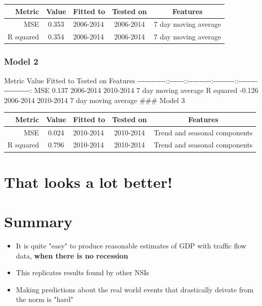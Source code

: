 \documentclass[11pt]{article}
\providecommand{\tightlist}{%
      \setlength{\itemsep}{0pt}\setlength{\parskip}{0pt}}
\begin{document}
\begin{longtable}[c]{@{}rclcc@{}}
\toprule
Metric & Value & Fitted to & Tested on & Features\tabularnewline
\midrule
\endhead
MSE & 0.353 & 2006-2014 & 2006-2014 & 7 day moving
average\tabularnewline
R squared & 0.354 & 2006-2014 & 2006-2014 & 7 day moving
average\tabularnewline
\bottomrule
\end{longtable}

\subsubsection{Model 2}\label{model-2}

\textbar{} Metric \textbar{} Value \textbar{} Fitted to \textbar{}
Tested on \textbar{}Features \textbar{} \textbar{}
-\/-\/-\/-\/-\/-\/-\/-\/-\/-\/-\/-:\textbar{}:-\/-\/-\/-\/-\/-:\textbar{}:-\/-\/-\/-\/-\/-\/-\/-\/-\/-\textbar{}:-\/-\/-\/-\/-\/-\/-\/-\/-:\textbar{}:-\/-\/-\/-\/-\/-\/-\/-\/-\/-\/-\/-\/-\/-\/-\/-\/-\/-\/-:\textbar{}
\textbar{} MSE \textbar{} 0.137 \textbar{} 2006-2014 \textbar{}
2010-2014 \textbar{} 7 day moving average \textbar{} \textbar{} R
squared \textbar{} -0.126 \textbar{} 2006-2014 \textbar{} 2010-2014
\textbar{} 7 day moving average \textbar{} \#\#\# Model 3

\begin{longtable}[c]{@{}rclcc@{}}
\toprule
Metric & Value & Fitted to & Tested on & Features\tabularnewline
\midrule
\endhead
MSE & 0.024 & 2010-2014 & 2010-2014 & Trend and seasonal
components\tabularnewline
R squared & 0.796 & 2010-2014 & 2010-2014 & Trend and seasonal
components\tabularnewline
\bottomrule
\end{longtable}

    \section{That looks a lot better!}\label{that-looks-a-lot-better}

    \section{Summary}\label{summary}

    \begin{itemize}
\tightlist
\item
  It is quite "easy" to produce reasonable estimates of GDP with traffic
  flow data, \textbf{when there is no recession}
\item
  This replicates results found by other NSIs
\item
  Making predictions about the real world events that drastically
  deivate from the norm is "hard"
\end{itemize}
\end{document}
